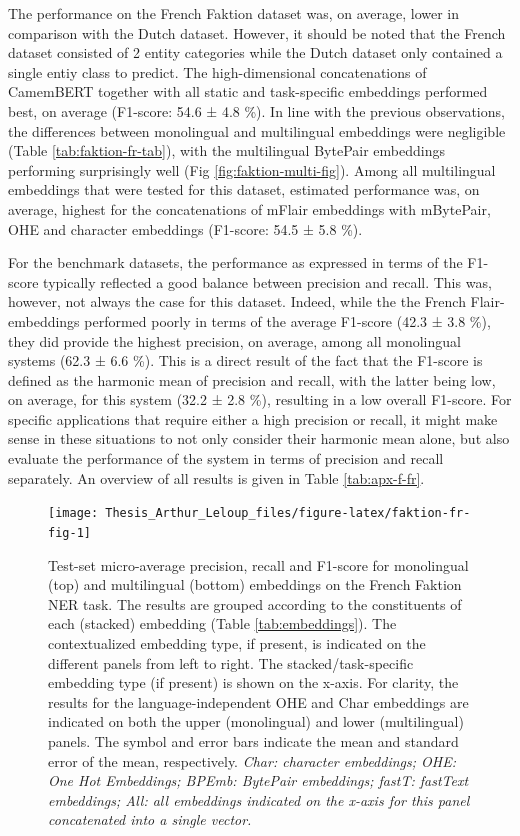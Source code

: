 \documentclass[12pt,a4paper,]{book}
\begin{document}
The performance on the French Faktion dataset was, on average, lower in comparison with the Dutch dataset. However, it should be noted that the French dataset consisted of 2 entity categories while the Dutch dataset only contained a single entiy class to predict. The high-dimensional concatenations of CamemBERT together with all static and task-specific embeddings performed best, on average (F1-score: 54.6 ± 4.8 \%). In line with the previous observations, the differences between monolingual and multilingual embeddings were negligible (Table \ref{tab:faktion-fr-tab}), with the multilingual BytePair embeddings performing surprisingly well (Fig \ref{fig:faktion-multi-fig}). Among all multilingual embeddings that were tested for this dataset, estimated performance was, on average, highest for the concatenations of mFlair embeddings with mBytePair, OHE and character embeddings (F1-score: 54.5 ± 5.8 \%).

For the benchmark datasets, the performance as expressed in terms of the F1-score typically reflected a good balance between precision and recall. This was, however, not always the case for this dataset. Indeed, while the the French Flair-embeddings performed poorly in terms of the average F1-score (42.3 ± 3.8 \%), they did provide the highest precision, on average, among all monolingual systems (62.3 ± 6.6 \%). This is a direct result of the fact that the F1-score is defined as the harmonic mean of precision and recall, with the latter being low, on average, for this system (32.2 ± 2.8 \%), resulting in a low overall F1-score. For specific applications that require either a high precision or recall, it might make sense in these situations to not only consider their harmonic mean alone, but also evaluate the performance of the system in terms of precision and recall separately. An overview of all results is given in Table \ref{tab:apx-f-fr}.

\begin{figure}

{\centering \texttt{[image: Thesis\_Arthur\_Leloup\_files/figure-latex/faktion-fr-fig-1]} 

}

\caption{Test-set micro-average precision, recall and F1-score for monolingual (top) and multilingual (bottom) embeddings on the French Faktion NER task. The results are grouped according to the constituents of each (stacked) embedding (Table \ref{tab:embeddings}). The contextualized embedding type, if present, is indicated on the different panels from left to right. The stacked/task-specific embedding type (if present) is shown on the x-axis. For clarity, the results for the language-independent OHE and Char embeddings are indicated on both the upper (monolingual) and lower (multilingual) panels. The symbol and error bars indicate the mean and standard error of the mean, respectively. \emph{Char: character embeddings; OHE: One Hot Embeddings; BPEmb: BytePair embeddings; fastT: fastText embeddings; All: all embeddings indicated on the x-axis for this panel concatenated into a single vector.}}\label{fig:faktion-fr-fig}
\end{figure}
\end{document}
